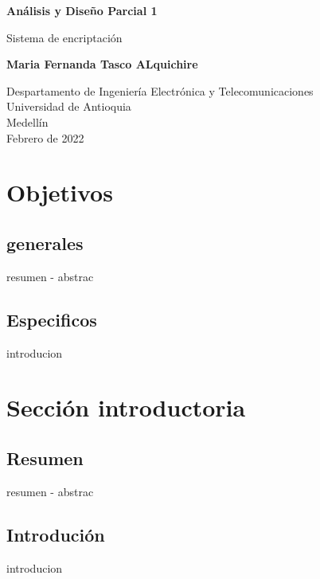 \documentclass{article}
\begin{document}
\begin{titlepage}
    \begin{center}
        \vspace*{1cm}
            
        \Huge
        \textbf{Análisis y Diseño Parcial 1}
            
        \vspace{0.5cm}
        \LARGE
        Sistema de encriptación 
            
        \vspace{5cm}
            
        \textbf{Maria Fernanda Tasco ALquichire}
            
        \vfill
            
        \vspace{0.8cm}
            
        \Large
        Despartamento de Ingeniería Electrónica y Telecomunicaciones\\
        Universidad de Antioquia\\
        Medellín\\
        Febrero de 2022
            
    \end{center}
\end{titlepage}

\tableofcontents
\newpage

\section{Objetivos}\label{intro}
\subsection{generales}
resumen - abstrac
\subsection{Especificos}
introducion

\section{Sección introductoria}\label{intro}
\subsection{Resumen}
resumen - abstrac
\subsection{Introdución}
introducion
\end{document}
